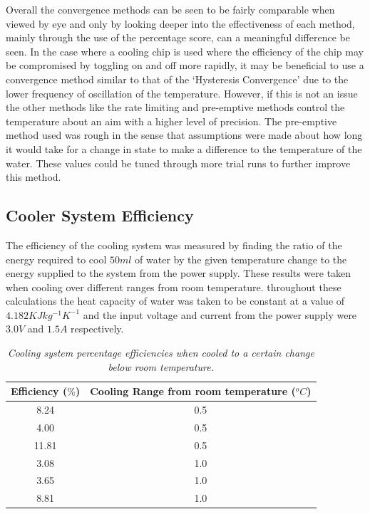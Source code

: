 \documentclass[10pt]{article}
\begin{document}
Overall the convergence methods can be seen to be fairly comparable when viewed by eye and only by looking deeper into the effectiveness of each method, mainly through the use of the percentage score, can a meaningful difference be seen. In the case where a cooling chip is used where the efficiency of the chip may be compromised by toggling on and off more rapidly, it may be beneficial to use a convergence method similar to that of the `Hysteresis Convergence' due to the lower frequency of oscillation of the temperature. However, if this is not an issue the other methods like the rate limiting and pre-emptive methods control the temperature about an aim with a higher level of precision. The pre-emptive method used was rough in the sense that assumptions were made about how long it would take for a change in state to make a difference to the temperature of the water. These values could be tuned through more trial runs to further improve this method.

\subsection*{Cooler System Efficiency}
The efficiency of the cooling system was measured by finding the ratio of the energy required to cool $50ml$ of water by the given temperature change to the energy supplied to the system from the power supply. These results were taken when cooling over different ranges from room temperature. throughout these calculations the heat capacity of water was taken to be constant at a value of $4.182KJkg^{-1}K^{-1}$\cite{heat_cap_val} and the input voltage and current from the power supply were $3.0V$ and $1.5A$ respectively. \\

\begin{table}[h!]
    \centering
    \begin{tabular}{|c|c|}
        \hline
        Efficiency ($\%$) & Cooling Range from room temperature ($^oC$) \\
        \hline
        8.24 & 0.5 \\
        4.00 & 0.5\\
        11.81 & 0.5 \\
        3.08 & 1.0\\
        3.65 & 1.0\\
        8.81 & 1.0\\
        \hline 
    \end{tabular}
    \caption{\it{Cooling system percentage efficiencies when cooled to a certain change below room temperature.}}
    \label{tab:efficiencies}
\end{table}
\end{document}
